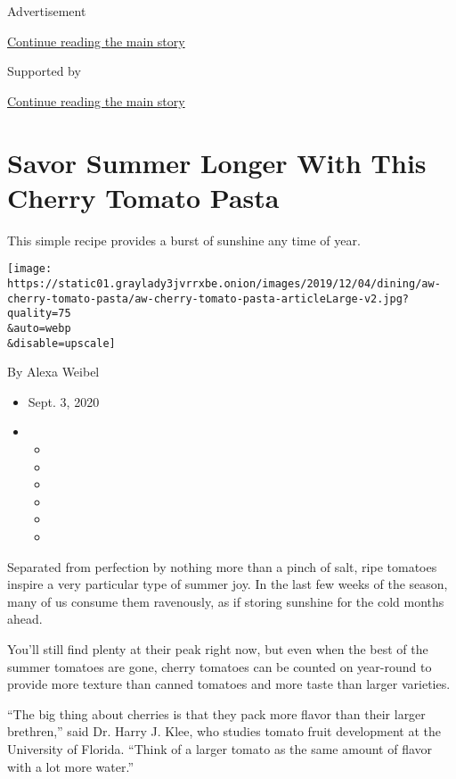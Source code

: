 Advertisement

\protect\hyperlink{after-top}{Continue reading the main story}

Supported by

\protect\hyperlink{after-sponsor}{Continue reading the main story}

\hypertarget{savor-summer-longer-with-this-cherry-tomato-pasta}{%
\section{Savor Summer Longer With This Cherry Tomato
Pasta}\label{savor-summer-longer-with-this-cherry-tomato-pasta}}

This simple recipe provides a burst of sunshine any time of year.

\texttt{[image: https://static01.graylady3jvrrxbe.onion/images/2019/12/04/dining/aw-cherry-tomato-pasta/aw-cherry-tomato-pasta-articleLarge-v2.jpg?quality=75\\\&auto=webp\\\&disable=upscale]}

By Alexa Weibel

\begin{itemize}
\item
  Sept. 3, 2020
\item
  \begin{itemize}
  \item
  \item
  \item
  \item
  \item
  \item
  \end{itemize}
\end{itemize}

Separated from perfection by nothing more than a pinch of salt, ripe
tomatoes inspire a very particular type of summer joy. In the last few
weeks of the season, many of us consume them ravenously, as if storing
sunshine for the cold months ahead.

You'll still find plenty at their peak right now, but even when the best
of the summer tomatoes are gone, cherry tomatoes can be counted on
year-round to provide more texture than canned tomatoes and more taste
than larger varieties.

``The big thing about cherries is that they pack more flavor than their
larger brethren,'' said Dr. Harry J. Klee, who studies tomato fruit
development at the University of Florida. ``Think of a larger tomato as
the same amount of flavor with a lot more water.''

